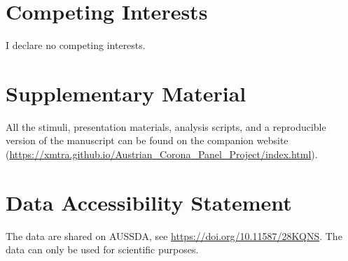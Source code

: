 \documentclass[
  english,
  man,mask,floatsintext]{apa6}
\begin{document}
\newpage

\hypertarget{competing-interests}{%
\section{Competing Interests}\label{competing-interests}}

I declare no competing interests.

\hypertarget{supplementary-material}{%
\section{Supplementary Material}\label{supplementary-material}}

All the stimuli, presentation materials, analysis scripts, and a reproducible version of the manuscript can be found on the companion website (\url{https://xmtra.github.io/Austrian_Corona_Panel_Project/index.html}).

\hypertarget{data-accessibility-statement}{%
\section{Data Accessibility Statement}\label{data-accessibility-statement}}

The data are shared on AUSSDA, see \url{https://doi.org/10.11587/28KQNS}.
The data can only be used for scientific purposes.
\end{document}

